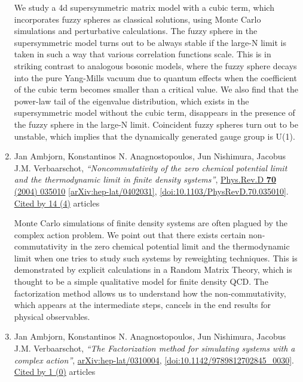 \documentclass[a4paper,10pt]{article}
\begin{document}
\begin{enumerate}
We study a 4d supersymmetric matrix model with a cubic term, which incorporates fuzzy spheres as classical solutions, using Monte Carlo simulations and perturbative calculations. The fuzzy sphere in the supersymmetric model turns out to be always stable if the large-N limit is taken in such a way that various correlation functions scale. This is in striking contrast to analogous bosonic models, where the fuzzy sphere decays into the pure Yang-Mills vacuum due to quantum effects when the coefficient of the cubic term becomes smaller than a critical value. We also find that the power-law tail of the eigenvalue distribution, which exists in the supersymmetric model without the cubic term, disappears in the presence of the fuzzy sphere in the large-N limit. Coincident fuzzy spheres turn out to be unstable, which implies that the dynamically generated gauge group is U(1).
\item Jan Ambjorn, Konstantinos N. Anagnostopoulos, Jun Nishimura, Jacobus J.M. Verbaarschot, {\it ``Noncommutativity of the zero chemical potential limit and the thermodynamic limit in finite density systems''}, \href{https://www.doi.org/10.1103/PhysRevD.70.035010}{Phys.Rev.D {\bf 70} (2004) 035010} \href{https://arxiv.org/abs/hep-lat/0402031}{[arXiv:hep-lat/0402031]}, \href{https://www.doi.org/10.1103/PhysRevD.70.035010}{[doi:10.1103/PhysRevD.70.035010]}.
\\\href{https://inspirehep.net/literature/?q=refersto%3Arecid%3A645128}{Cited by 14 (4)} articles

Monte Carlo simulations of finite density systems are often plagued by the complex action problem. We point out that there exists certain non-commutativity in the zero chemical potential limit and the thermodynamic limit when one tries to study such systems by reweighting techniques. This is demonstrated by explicit calculations in a Random Matrix Theory, which is thought to be a simple qualitative model for finite density QCD. The factorization method allows us to understand how the non-commutativity, which appears at the intermediate steps, cancels in the end results for physical observables.
\item Jan Ambjorn, Konstantinos N. Anagnostopoulos, Jun Nishimura, Jacobus J.M. Verbaarschot, {\it ``The Factorization method for simulating systems with a complex action''}, \href{https://arxiv.org/abs/hep-lat/0310004}{arXiv:hep-lat/0310004}, \href{https://www.doi.org/10.1142/9789812702845_0030}{[doi:10.1142/9789812702845\_0030]}.
\\\href{https://inspirehep.net/literature/?q=refersto%3Arecid%3A629664}{Cited by 1 (0)} articles


\end{enumerate}
\end{document}
